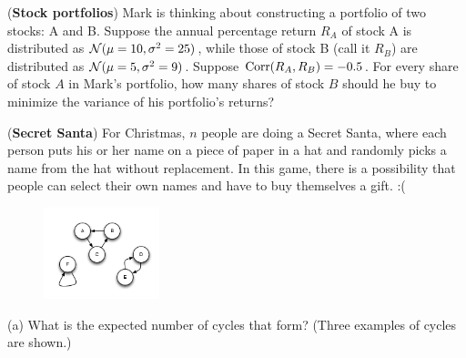 \documentclass{article}
\begin{document}
({\bf Stock portfolios}) Mark is thinking about constructing a portfolio of two stocks: A and B. Suppose the annual percentage return $R_A$ of stock A is distributed as $\mathcal{N}(\mu=10, \sigma^2=25)$, while those of stock B (call it $R_B$) are distributed as $\mathcal{N}(\mu=5, \sigma^2=9)$. Suppose $\textrm{Corr}(R_A,R_B) = -0.5$. For every share of stock $A$ in Mark's portfolio, how many shares of stock $B$ should he buy to minimize the variance of his portfolio's returns?


({\bf Secret Santa}) For Christmas, $n$ people are doing a Secret Santa, where each person puts his or her name on a piece of paper in a hat and randomly picks a name from the hat without replacement. In this game, there is a possibility that people can select their own names and have to buy themselves a gift. :( 

\begin{figure}[!ht]
\begin{center}
\includegraphics[width = 0.3\textwidth]{cycle.PNG}
\end{center}
\end{figure}

(a) What is the expected number of cycles that form? (Three examples of cycles are shown.)
\end{document}
